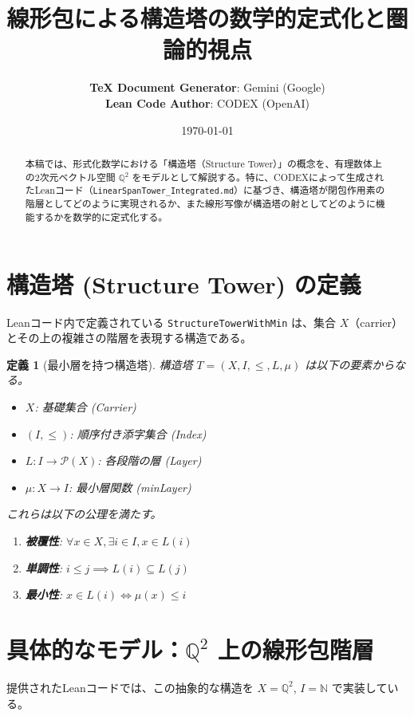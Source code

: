 \documentclass[11pt, a4paper]{article}
\title{線形包による構造塔の数学的定式化と圏論的視点}
\author{
    \textbf{TeX Document Generator}: Gemini (Google) \\
    \textbf{Lean Code Author}: CODEX (OpenAI)
}
\date{\today}
\newtheorem{definition}{定義}[section]
\begin{document}
\maketitle

\begin{abstract}
本稿では、形式化数学における「構造塔（Structure Tower）」の概念を、有理数体上の2次元ベクトル空間 $\mathbb{Q}^2$ をモデルとして解説する。特に、CODEXによって生成されたLeanコード（\texttt{LinearSpanTower\_Integrated.md}）に基づき、構造塔が閉包作用素の階層としてどのように実現されるか、また線形写像が構造塔の射としてどのように機能するかを数学的に定式化する。
\end{abstract}

\section{構造塔 (Structure Tower) の定義}

Leanコード内で定義されている \texttt{StructureTowerWithMin} は、集合 $X$（carrier）とその上の複雑さの階層を表現する構造である。

\begin{definition}[最小層を持つ構造塔]
構造塔 $T = (X, I, \le, L, \mu)$ は以下の要素からなる。
\begin{itemize}
    \item $X$: 基礎集合 (Carrier)
    \item $(I, \le)$: 順序付き添字集合 (Index)
    \item $L: I \to \mathcal{P}(X)$: 各段階の層 (Layer)
    \item $\mu: X \to I$: 最小層関数 (minLayer)
\end{itemize}
これらは以下の公理を満たす。
\begin{enumerate}
    \item \textbf{被覆性}: $\forall x \in X, \exists i \in I, x \in L(i)$
    \item \textbf{単調性}: $i \le j \implies L(i) \subseteq L(j)$
    \item \textbf{最小性}: $x \in L(i) \iff \mu(x) \le i$
\end{enumerate}
\end{definition}

\section{具体的なモデル：$\mathbb{Q}^2$ 上の線形包階層}

提供されたLeanコードでは、この抽象的な構造を $X = \mathbb{Q}^2$, $I = \mathbb{N}$ で実装している。
\end{document}
